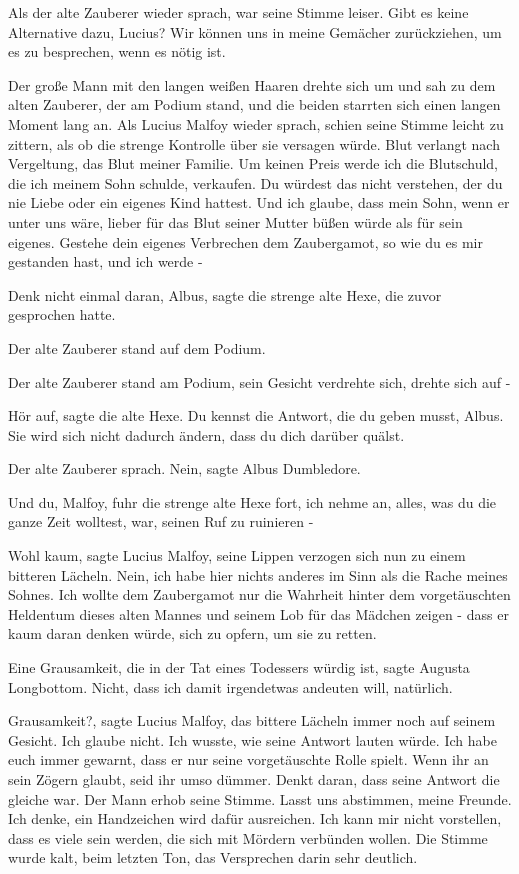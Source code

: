 Als der alte Zauberer wieder sprach, war seine Stimme leiser. \glqq{}Gibt es
keine Alternative dazu, Lucius? Wir können uns in meine Gemächer zurückziehen,
um es zu besprechen, wenn es nötig ist.\grqq{}

Der große Mann mit den langen weißen Haaren drehte sich um und sah zu dem alten
Zauberer, der am Podium stand, und die beiden starrten sich einen langen Moment
lang an. Als Lucius Malfoy wieder sprach, schien seine Stimme leicht zu zittern,
als ob die strenge Kontrolle über sie versagen würde. \glqq{}Blut verlangt nach
Vergeltung, das Blut meiner Familie. Um keinen Preis werde ich die Blutschuld,
die ich meinem Sohn schulde, verkaufen. Du würdest das nicht verstehen, der du
nie Liebe oder ein eigenes Kind hattest. Und ich glaube, dass mein Sohn, wenn er
unter uns wäre, lieber für das Blut seiner Mutter büßen würde als für sein
eigenes. Gestehe dein eigenes Verbrechen dem Zaubergamot, so wie du es mir
gestanden hast, und ich werde -\grqq{}

\glqq{}Denk nicht einmal daran, Albus\grqq{}, sagte die strenge alte Hexe, die
zuvor gesprochen hatte.

Der alte Zauberer stand auf dem Podium.

Der alte Zauberer stand am Podium, sein Gesicht verdrehte sich, drehte sich auf
-

\glqq{}Hör auf\grqq{}, sagte die alte Hexe. \glqq{}Du kennst die Antwort, die du
geben musst, Albus. Sie wird sich nicht dadurch ändern, dass du dich darüber
quälst.\grqq{}

Der alte Zauberer sprach. \glqq{}Nein\grqq{}, sagte Albus Dumbledore.

\glqq{}Und du, Malfoy\grqq{}, fuhr die strenge alte Hexe fort, \glqq{}ich nehme
an, alles, was du die ganze Zeit wolltest, war, seinen Ruf zu ruinieren -\grqq{}

\glqq{}Wohl kaum\grqq{}, sagte Lucius Malfoy, seine Lippen verzogen sich nun zu
einem bitteren Lächeln. \glqq{}Nein, ich habe hier nichts anderes im Sinn als die
Rache meines Sohnes. Ich wollte dem Zaubergamot nur die Wahrheit hinter dem
vorgetäuschten Heldentum dieses alten Mannes und seinem Lob für das Mädchen
zeigen - dass er kaum daran denken würde, sich zu opfern, um sie zu
retten.\grqq{}

\glqq{}Eine Grausamkeit, die in der Tat eines Todessers würdig ist\grqq{}, sagte
Augusta Longbottom. \glqq{}Nicht, dass ich damit irgendetwas andeuten will,
natürlich.\grqq{}

\glqq{}Grausamkeit?\grqq{}, sagte Lucius Malfoy, das bittere Lächeln immer noch
auf seinem Gesicht. \glqq{}Ich glaube nicht. Ich wusste, wie seine Antwort lauten
würde. Ich habe euch immer gewarnt, dass er nur seine vorgetäuschte Rolle
spielt. Wenn ihr an sein Zögern glaubt, seid ihr umso dümmer. Denkt daran, dass
seine Antwort die gleiche war.\grqq{} Der Mann erhob seine Stimme. \glqq{}Lasst
uns abstimmen, meine Freunde. Ich denke, ein Handzeichen wird dafür ausreichen.
Ich kann mir nicht vorstellen, dass es viele sein werden, die sich mit Mördern
verbünden wollen.\grqq{} Die Stimme wurde kalt, beim letzten Ton, das
Versprechen darin sehr deutlich.

